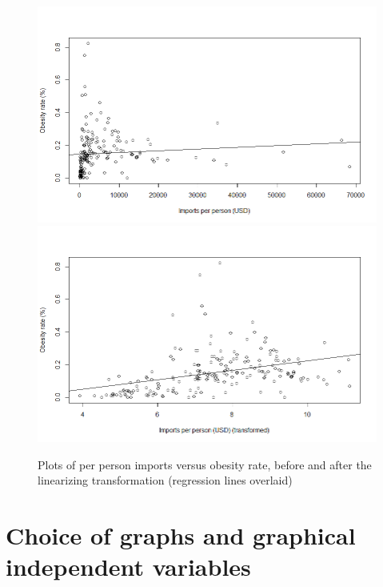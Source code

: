\documentclass[oneside,12pt]{report}
\begin{document}
\begin{figure}
\centering
\caption{Plots of per person imports versus obesity rate, before and after the linearizing transformation (regression lines overlaid)}
\label{fig:ppimports-obesity-prepost}
\includegraphics[width=\textwidth]{ppimports-obesity-pretransform.png}
\includegraphics[width=\textwidth]{ppimports-obrate-posttransform.png}
\end{figure}

\section*{Choice of graphs and graphical independent variables}
\end{document}
